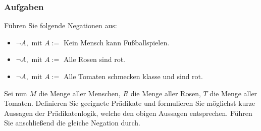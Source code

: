 \subsubsection{Aufgaben}
Führen Sie folgende Negationen aus:
\begin{itemize}
	\item $\neg A, \text{ mit } A:= $ Kein Mensch kann Fußballspielen.
	\item $\neg A, \text{ mit } A := $ Alle Rosen sind rot.
	\item $\neg A, \text{ mit } A := $ Alle Tomaten schmecken klasse und sind rot.
\end{itemize}
Sei nun $M$ die Menge aller Menschen, $R$ die Menge aller Rosen, $T$ die Menge aller Tomaten. Definieren Sie geeignete Prädikate und formulieren Sie möglichst kurze Aussagen der Prädikatenlogik, welche den obigen Aussagen entsprechen. Führen Sie anschließend die gleiche Negation durch.